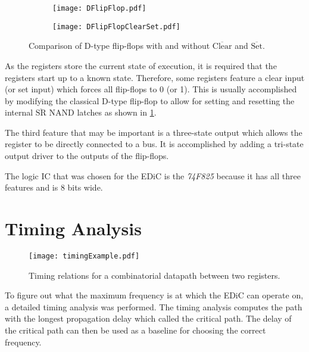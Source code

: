\begin{figure}[t]
  \centering
  \begin{subfigure}[b]{.45\textwidth}
    \texttt{[image: DFlipFlop.pdf]}
  \end{subfigure}%
  \hspace{.05\textwidth}
  \begin{subfigure}[b]{.45\textwidth}
    \texttt{[image: DFlipFlopClearSet.pdf]}
  \end{subfigure}
  \caption{Comparison of D-type flip-flops with and without $\overline{\text{Clear}}$ and $\overline{\text{Set}}$.}
  \label{fig:clearSet}
\end{figure}
As the registers store the current state of execution, it is required that the registers start up to a known state.
Therefore, some registers feature a clear input (or set input) which forces all flip-flops to 0 (or 1).
This is usually accomplished by modifying the classical D-type flip-flop to allow for setting and resetting the internal $\overline{\text{SR}}$ NAND latches as shown in \cref{fig:clearSet}.

The third feature that may be important is a three-state output which allows the register to be directly connected to a bus.
It is accomplished by adding a tri-state output driver to the outputs of the flip-flops.

The logic \gls{IC} that was chosen for the \gls{EDiC} is the \emph{74F825} because it has all three features and is 8 bits wide.

\section{Timing Analysis}\label{sec:timing}
\begin{figure}[t]
  \centering
  \texttt{[image: timingExample.pdf]}
  \caption{Timing relations for a combinatorial datapath between two registers.}
  \label{fig:timingExample}
\end{figure}
To figure out what the maximum frequency is at which the \gls{EDiC} can operate on, a detailed timing analysis was performed.
The timing analysis computes the path with the longest propagation delay which called the critical path.
The delay of the critical path can then be used as a baseline for choosing the correct frequency.

